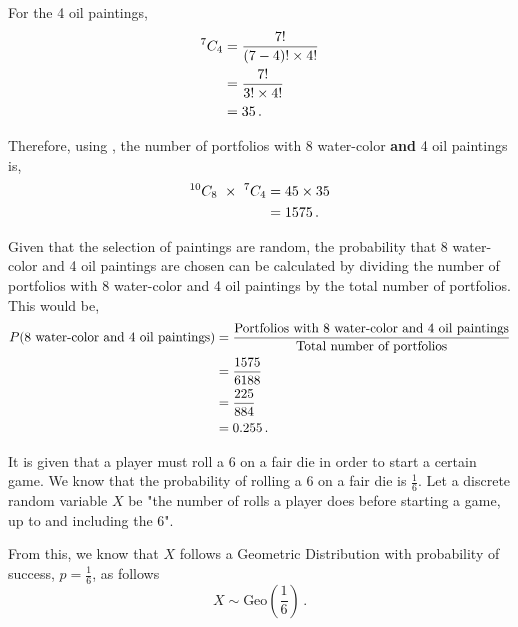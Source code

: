 \begin{subquestions}
\begin{subsubquestions}
For the 4 oil paintings,
\begin{align}
	^{7}C_{4} & = \frac{7!}{(7-4)! \times 4!} \nonumber \\
	          & = \frac{7!}{3! \times 4!} \nonumber \\
	          & = 35 \,.
\end{align}

Therefore, using , the number of portfolios with 8 water-color \textbf{and} 4 oil paintings is,
\begin{align}
	^{10}C_{8} ~\times ~ ^7C_{4} & = 45 \times 35 \nonumber \\
	                            & = 1575 \,.
\end{align}


\subsubquestion

Given that the selection of paintings are random, the probability that 8 water-color and 4 oil paintings are chosen can be calculated by dividing the number of portfolios with 8 water-color and 4 oil paintings by the total number of portfolios. This would be,
\begin{align}
	P(\text{8 water-color and 4 oil paintings}) & = \frac{\text{Portfolios with 8 water-color and 4 oil paintings}}{\text{Total number of portfolios}} \nonumber \\
	                                            & = \frac{1575}{6188} \nonumber \\
	                                            & = \frac{225}{884} \nonumber \\
	                                            & = 0.255 \,.
\end{align}

\end{subsubquestions}
	

\subquestion

It is given that a player must roll a 6 on a fair die in order to start a certain game. We know that the probability of rolling a 6 on a fair die is $\frac{1}{6}$. Let a discrete random variable $X$ be "the number of rolls a player does before starting a game, up to and including the 6".

From this, we know that $X$ follows a Geometric Distribution with probability of success, $p=\frac{1}{6}$, as follows
\begin{equation}
	X \sim \text{Geo} \left(\frac{1}{6} \right) \,.
\end{equation}


\end{subquestions}
